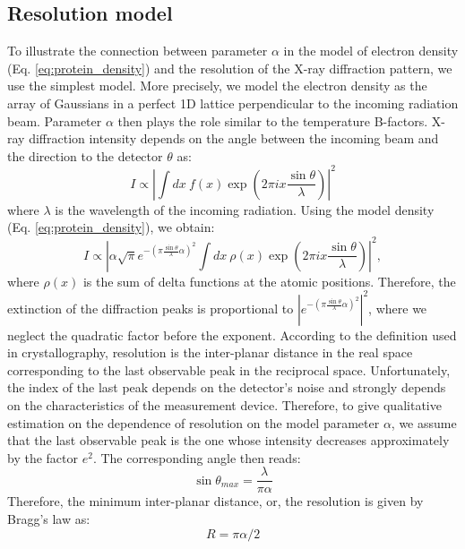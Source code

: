 \subsection{Resolution model}
\label{Sec: ResolutionModel}
To illustrate the connection between parameter $\alpha$ in the model of electron density (Eq. \ref{eq:protein_density}) and the resolution of 
the X-ray diffraction pattern, we use the simplest model. More precisely, we model the electron density as the 
array of Gaussians in a perfect 1D lattice perpendicular to the incoming radiation beam. Parameter $\alpha$ then plays the role similar to the temperature B-factors.
X-ray diffraction intensity depends on the angle between the incoming beam and the direction to the detector $\theta$ as:
\begin{equation}
I \propto \left|\int dx~ f(x)\exp\left( 2\pi i x \frac{\sin\theta}{\lambda}\right)\right|^2
\end{equation}
where $\lambda$ is the wavelength of the incoming radiation. Using the model density (Eq. \ref{eq:protein_density}), we obtain:
\begin{equation}
I \propto \left|\alpha\sqrt{\pi}e^{-(\pi \frac{\sin\theta}{\lambda} \alpha)^{2}} \int dx~ \rho(x)\exp\left( 2\pi i x \frac{\sin\theta}{\lambda}\right)\right|^2
,
\end{equation}
where $\rho(x)$ is the sum of delta functions at the atomic positions. Therefore, the extinction of the diffraction peaks
is proportional to $\left|e^{-(\pi \frac{\sin\theta}{\lambda} \alpha)^{2}}\right|^2$, where we neglect the quadratic factor before the exponent. 
%
According to the definition used in crystallography, resolution is the inter-planar distance in the real space corresponding to the last observable peak in the reciprocal space. 
Unfortunately, the index of the last peak depends on the detector's noise and strongly depends on the characteristics of the measurement device. Therefore, to give qualitative estimation
on the dependence of resolution on the model parameter $\alpha$, we assume that the last observable peak is the one whose intensity decreases approximately by the factor $e^2$. 
The corresponding angle then reads:
\begin{equation}
\sin\theta_{max}=\frac{\lambda}{\pi\alpha}
\end{equation}
Therefore, the minimum inter-planar distance, or, the resolution is given by Bragg's law as:
\begin{equation}
R=\pi\alpha/2 \label{eq:RFactorAppendix}
\end{equation}
